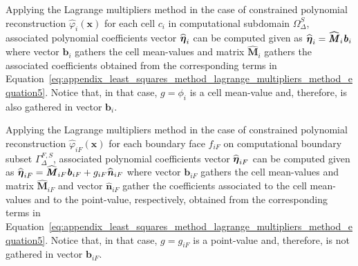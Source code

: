 Applying the Lagrange multipliers method in the case of constrained polynomial reconstruction $\widehat{\varphi}_{i}\left(\bm{x}\right)$ for each cell $c_{i}$ in computational subdomain $\Omega^{S}_{\Delta}$, associated polynomial coefficients vector $\widehat{\boldsymbol{\eta}}_{i}$ can be computed given as $\widehat{\boldsymbol{\eta}}_{i}=\widehat{\textrm{\textbf{\textit{M}}}}_{i}\textrm{\textbf{\textit{b}}}_{i}$ where vector $\bm{b}_{i}$ gathers the cell mean-values and matrix $\widehat{\bm{M}}_{i}$ gathers the associated coefficients obtained from the corresponding terms in Equation~\cref{eq:appendix_least_squares_method_lagrange_multipliers_method_equation5}.
Notice that, in that case, $g=\phi_{i}$ is a cell mean-value and, therefore, is also gathered in vector $\bm{b}_{i}$.

Applying the Lagrange multipliers method in the case of constrained polynomial reconstruction $\widehat{\varphi}_{iF}\left(\bm{x}\right)$ for each boundary face $f_{iF}$ on computational boundary subset $\Gamma^{F,S}_{\Delta}$, associated polynomial coefficients vector $\widehat{\boldsymbol{\eta}}_{iF}$ can be computed given as $\widehat{\boldsymbol{\eta}}_{iF}=\widehat{\textrm{\textbf{\textit{M}}}}_{iF}\textrm{\textbf{\textit{b}}}_{iF}+g_{iF}\widehat{\textrm{\textbf{\textit{n}}}}_{iF}$ where vector $\bm{b}_{iF}$ gathers the cell mean-values and matrix $\widehat{\bm{M}}_{iF}$ and vector $\widehat{\bm{n}}_{iF}$ gather the coefficients associated to the cell mean-values and to the point-value, respectively, obtained from the corresponding terms in Equation~\cref{eq:appendix_least_squares_method_lagrange_multipliers_method_equation5}.
Notice that, in that case, $g=g_{iF}$ is a point-value and, therefore, is not gathered in vector $\bm{b}_{iF}$.

